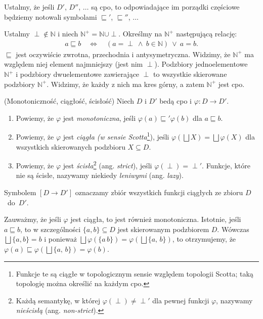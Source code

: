 Ustalmy, że jeśli \(D'\), \(D''\), \(\dots\)  są cpo, to odpowiadające im porządki częściowe będziemy notowali symbolami \(\sqsubseteq'\), \(\sqsubseteq''\), \(\dots\)

\begin{przyklad}\label{ex:scott_d0}
  Ustalmy \(\perp\not\in \mathbb{N}\) i niech \(\mathbb{N}^{+}=\mathbb{N}\cup{\perp}\). Określmy na \(\mathbb{N}^+\) następującą relację:
  \begin{align*}
    a \sqsubseteq b \quad \Leftrightarrow\quad (a=\perp\ \land\ b\in \mathbb{N})\ \lor\ a = b.
  \end{align*}
  \(\sqsubseteq\) jest oczywiście zwrotna, przechodnia i antysymetryczna. Widzimy, że \(\mathbb{N}^{+}\) ma względem niej element najmniejszy (jest nim  \(\perp\)). Podzbiory jednoelementowe \(\mathbb{N}^{+}\) i podzbiory dwuelementowe zawierające \(\perp\) to wszystkie skierowane podzbiory \(\mathbb{N}^{+}\). Widzimy, że każdy z nich ma kres górny, a zatem \(\mathbb{N}^{+}\) jest cpo.
\end{przyklad}

\begin{definicja}(Monotoniczność, ciągłość, ścisłość)\label{def:m_cont} %
Niech \(D\) i \(D'\) bedą cpo i \(\varphi: D\to D'\).
\begin{enumerate}[label={(\alph*)}, ref={(\alph*)}] 
  \setlength\itemsep{0em}
\item Powiemy, że \(\varphi\) jest \emph{monotoniczna}, jeśli \(\varphi(a) \sqsubseteq' \varphi(b)\) dla \(a\sqsubseteq b\).
\item Powiemy, że \(\varphi\) jest \emph{ciągła (w sensie Scotta}\footnote{Funkcje te są ciągłe w topologicznym sensie względem topologii Scotta; taką topologię można określić na każdym cpo.}), jeśli \(\varphi(\bigsqcup X) = \bigsqcup \varphi (X)\) dla wszystkich skierowanych podzbioru \(X\subseteq D\).\label{def:m_cont_2}
\item Powiemy, że \(\varphi\) jest \emph{ścisła}\footnote{Każdą semantykę, w której \(\varphi(\perp)\neq\perp'\) dla pewnej funkcji \(\varphi\), nazywamy \emph{nieścisłą} (ang. \emph{non-strict}).} 
 (ang. \emph{strict}), jeśli \(\varphi(\perp)=\perp'\). Funkcje, które nie są ścisłe, nazywamy niekiedy \emph{leniwymi} (ang. \emph{lazy}).
\end{enumerate}
Symbolem \([D\to D']\) oznaczamy zbiór wszystkich funkcji ciągłych ze zbioru \(D\)~do~\(D'\).
\end{definicja}

\begin{uwaga*}
Zauważmy, że jeśli \(\varphi\) jest ciągła, to jest również monotoniczna. Istotnie, jeśli \(a\sqsubseteq b\), to w szczególności \(\{a, b\}\subseteq D\) jest skierowanym podzbiorem \(D\). Wówczas \(\bigsqcup\{a, b\}=b\) i ponieważ \(\bigsqcup \varphi(\{a\,b\})=\varphi(\bigsqcup\{a,\,b\})\), to otrzymujemy, że \(\varphi(a)\sqsubseteq \varphi(\bigsqcup\{a,\,b\}) = \varphi(b)\).
\end{uwaga*}


